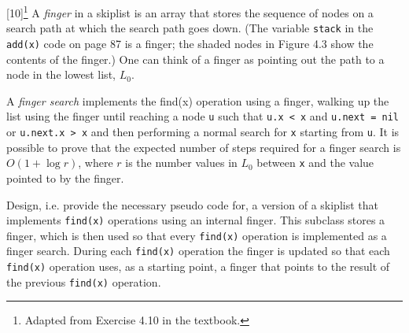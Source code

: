 \documentclass[addpoints]{exam}
\begin{document}
\begin{questions}
  [10]\footnote{Adapted from Exercise 4.10 in the textbook.}
  A \textit{finger} in a skiplist is an array that stores the sequence of nodes on a search path at which the search path goes down. (The variable \texttt{stack} in the \texttt{add(x)} code on page 87 is a finger; the shaded nodes in Figure 4.3 show the contents of the finger.) One can think of a finger as pointing out the path to a node in the lowest list, $L_0$.

  A \textit{finger search} implements the find(x) operation using a finger, walking up the list using the finger until reaching a node \texttt{u} such that \texttt{u.x < x} and \texttt{u.next = nil} or \texttt{u.next.x > x} and then performing a normal search for \texttt{x} starting from \texttt{u}. It is possible to prove that the expected number of steps required for a finger search is $O(1+\log r)$, where $r$ is the number values in $L_0$ between \texttt{x} and the value pointed to by the finger.

  Design, i.e. provide the necessary pseudo code for, a version of a skiplist that implements \texttt{find(x)} operations using an internal finger. This subclass stores a finger, which is then used so that every \texttt{find(x)} operation is implemented as a finger search. During each \texttt{find(x)} operation the finger is updated so that each \texttt{find(x)} operation uses, as a starting point, a finger that points to the result of the previous \texttt{find(x)} operation.
  \begin{solution}
  \end{solution}


\end{questions}
\end{document}
